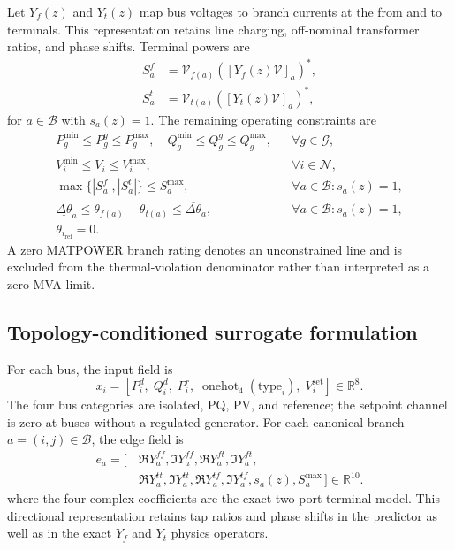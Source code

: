 \documentclass[final,5p,times,twocolumn]{elsarticle}
\newcommand{\R}{\mathbb{R}}
\newcommand{\Nset}{\mathcal{N}}
\newcommand{\Bset}{\mathcal{B}}
\newcommand{\Gset}{\mathcal{G}}
\begin{document}
Let $Y_f(z)$ and $Y_t(z)$ map bus voltages to branch currents at the from and
to terminals. This representation retains line charging, off-nominal
transformer ratios, and phase shifts. Terminal powers are
\begin{align}
  S_a^f
  &=
  \mathcal{V}_{f(a)}
  \left([Y_f(z)\mathcal{V}]_a\right)^*,
  \label{eq:from_flow}\\
  S_a^t
  &=
  \mathcal{V}_{t(a)}
  \left([Y_t(z)\mathcal{V}]_a\right)^*,
  \label{eq:to_flow}
\end{align}
for $a\in\Bset$ with $s_a(z)=1$.
The remaining operating constraints are
\begin{align}
  P_g^{\min}\leq P_g^g\leq P_g^{\max},
  \quad
  Q_g^{\min}\leq Q_g^g\leq Q_g^{\max},
  &&\forall g\in\Gset,
  \label{eq:gen_limits}\\
  V_i^{\min}\leq V_i\leq V_i^{\max},
  &&\forall i\in\Nset,
  \label{eq:voltage_limits}\\
  \max\{|S_a^f|,|S_a^t|\}\leq S_a^{\max},
  &&\forall a\in\Bset:s_a(z)=1,
  \label{eq:thermal_limits}\\
  \underline{\Delta\theta}_a
  \leq \theta_{f(a)}-\theta_{t(a)}
  \leq \overline{\Delta\theta}_a,
  &&\forall a\in\Bset:s_a(z)=1,
  \label{eq:angle_limits}\\
  \theta_{i_{\mathrm{ref}}}=0.
  \label{eq:slack}
\end{align}
A zero MATPOWER branch rating denotes an unconstrained line and is excluded
from the thermal-violation denominator rather than interpreted as a zero-MVA
limit.

\subsection{Topology-conditioned surrogate formulation}

For each bus, the input field is
\begin{equation}
  x_i =
  \left[
    P_i^d,\;Q_i^d,\;P_i^r,\;
    \operatorname{onehot}_{4}(\mathrm{type}_i),\;
    V_i^{\mathrm{set}}
  \right]\in\R^8.
  \label{eq:bus_features}
\end{equation}
The four bus categories are isolated, PQ, PV, and reference; the setpoint
channel is zero at buses without a regulated generator. For each canonical
branch $a=(i,j)\in\Bset$, the edge field is
\begin{equation}
  \begin{aligned}
  e_a=[\,
  &\Re Y_{a}^{ff},\Im Y_{a}^{ff},
   \Re Y_{a}^{ft},\Im Y_{a}^{ft},\\[-2pt]
  &\Re Y_{a}^{tt},\Im Y_{a}^{tt},
   \Re Y_{a}^{tf},\Im Y_{a}^{tf},
   s_a(z),S_a^{\max}\,]\in\R^{10}.
  \end{aligned}
  \label{eq:edge_features}
\end{equation}
where the four complex coefficients are the exact two-port terminal model.
This directional representation retains tap ratios and phase shifts in the
predictor as well as in the exact $Y_f$ and $Y_t$ physics operators.
\end{document}
